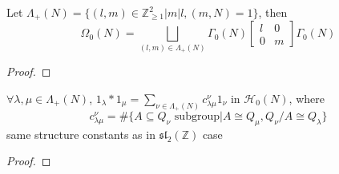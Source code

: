 \documentclass[main]{subfiles}
\begin{document}
\begin{lemma}
Let $\Lambda_+(N)=\{(l,m)\in\mathbb Z_{\geq1}^2|m|l,(m,N)=1\}$, then
\[\Omega_0(N)=\bigsqcup_{(l,m)\in\Lambda_+(N)}\Gamma_0(N)\begin{bmatrix}
l&0\\
0&m
\end{bmatrix}\Gamma_0(N)\]
\end{lemma}

\begin{proof}

\end{proof}

\begin{lemma}
$\forall\lambda,\mu\in\Lambda_+(N)$, $1_\lambda*1_\mu=\sum_{\nu\in\Lambda_+(N)}c^\nu_{\lambda\mu}1_\nu$ in $\mathscr H_0(N)$, where
\[c^\nu_{\lambda\mu}=\#\{A\subseteq Q_\nu\text{ subgroup}|A\cong Q_\mu,Q_\nu/A\cong Q_\lambda\}\]
same structure constants as in $\mathfrak{sl}_2(\mathbb Z)$ case
\end{lemma}

\begin{proof}

\end{proof}
\end{document}
